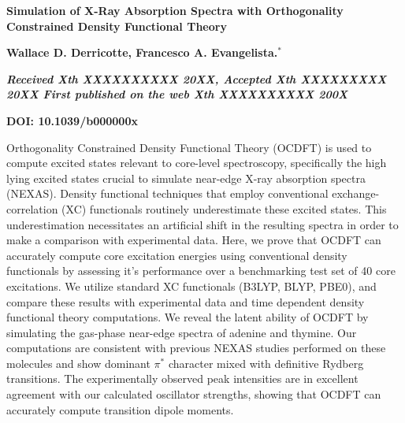 \documentclass[12pt]{article}
\begin{document}
\linenumbers
\noindent\LARGE{\textbf{
Simulation of X-Ray Absorption Spectra with Orthogonality Constrained Density Functional Theory
}}
\vspace{0.6cm}

\noindent\large{\textbf{Wallace D. Derricotte, Francesco A. Evangelista.$^{\ast}$}}\vspace{0.5cm}


\noindent\textit{\small{\textbf{Received Xth XXXXXXXXXX 20XX, Accepted Xth XXXXXXXXX 20XX\newline
First published on the web Xth XXXXXXXXXX 200X}}}

\noindent \textbf{\small{DOI: 10.1039/b000000x}}
\vspace{0.6cm}

\noindent \normalsize{Orthogonality Constrained Density Functional Theory (OCDFT) is used to compute excited states relevant to core-level spectroscopy, specifically the high lying excited states crucial to simulate near-edge X-ray absorption spectra (NEXAS). Density functional techniques that employ conventional exchange-correlation (XC) functionals routinely underestimate these excited states. This underestimation necessitates an artificial shift in the resulting spectra in order to make a comparison with experimental data. Here, we prove that OCDFT can accurately compute core excitation energies using conventional density functionals by assessing it's performance over a benchmarking test set of 40 core excitations. We utilize standard XC functionals (B3LYP, BLYP, PBE0), and compare these results with experimental data and time dependent density functional theory computations. We reveal the latent ability of OCDFT by simulating the gas-phase near-edge spectra of adenine and thymine. Our computations are consistent with previous NEXAS studies performed on these molecules and show dominant $\pi^*$ character mixed with definitive Rydberg transitions. The experimentally observed peak intensities are in excellent agreement with our calculated oscillator strengths, showing that OCDFT can accurately compute transition dipole moments.}
\vspace{0.5cm}

  \doublespacing
\end{document}
